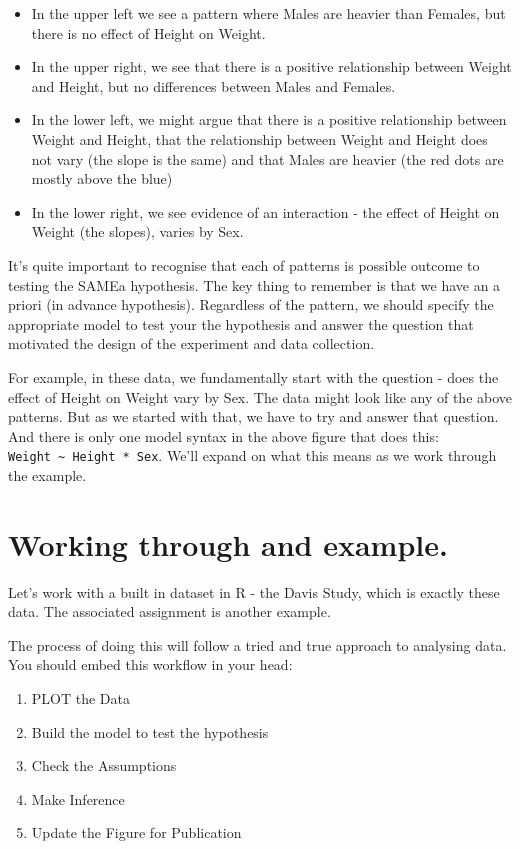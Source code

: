 \documentclass[
]{book}
\providecommand{\tightlist}{%
  \setlength{\itemsep}{0pt}\setlength{\parskip}{0pt}}
\begin{document}
\begin{itemize}
\tightlist
\item
  In the upper left we see a pattern where Males are heavier than Females, but there is no effect of Height on Weight.
\item
  In the upper right, we see that there is a positive relationship between Weight and Height, but no differences between Males and Females.
\item
  In the lower left, we might argue that there is a positive relationship between Weight and Height, that the relationship between Weight and Height does not vary (the slope is the same) and that Males are heavier (the red dots are mostly above the blue)
\item
  In the lower right, we see evidence of an interaction - the effect of Height on Weight (the slopes), varies by Sex.
\end{itemize}

It's quite important to recognise that each of patterns is possible outcome to testing the SAMEa hypothesis. The key thing to remember is that we have an a priori (in advance hypothesis). Regardless of the pattern, we should specify the appropriate model to test your the hypothesis and answer the question that motivated the design of the experiment and data collection.

For example, in these data, we fundamentally start with the question - does the effect of Height on Weight vary by Sex. The data might look like any of the above patterns. But as we started with that, we have to try and answer that question. And there is only one model syntax in the above figure that does this: \texttt{Weight\ \textasciitilde{}\ Height\ *\ Sex}. We'll expand on what this means as we work through the example.

\hypertarget{working-through-and-example.}{%
\section{Working through and example.}\label{working-through-and-example.}}

Let's work with a built in dataset in R - the Davis Study, which is exactly these data. The associated assignment is another example.

The process of doing this will follow a tried and true approach to analysing data. You should embed this workflow in your head:

\begin{enumerate}
\def\labelenumi{\arabic{enumi})}
\tightlist
\item
  PLOT the Data
\item
  Build the model to test the hypothesis
\item
  Check the Assumptions
\item
  Make Inference
\item
  Update the Figure for Publication
\end{enumerate}
\end{document}
